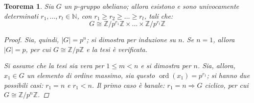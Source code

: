 \documentclass[12pt]{scrartcl}
\theoremstyle{style}
\newtheorem{teorema}{Teorema}[section]
\numberwithin{equation}{subsection}
\begin{document}
\begin{teorema}\label{corts2}
	Sia $G$ un $p$-gruppo abeliano; allora esistono e sono univocamente determinati $r_1,\ldots,r_t \in \mathbb{N}$, con $r_1\ge r_2\ge \ldots\ge r_t$, tali che:
	\[
	G \cong \mathbb{Z}/p^{r_1}\mathbb{Z} \times  \ldots \times \mathbb{Z} / p^{r_t}\mathbb{Z}
	\] 
	\begin{proof}
		Sia, quindi, $\lvert G \rvert =p^{n}$; si dimostra per induzione su $n$.
		Se $n=1$, allora $\lvert G \rvert = p$, per cui $G \cong \mathbb{Z} / p\mathbb{Z}$ e la tesi \`e verificata.

		Si assume che la tesi sia vera per $1 \le m < n $ e si dimostra per $n$. 
		Sia, allora, $x_1 \in G$ un elemento di ordine massimo, sia questo $\operatorname{ord}(x_1) =p^{r_1} $; si hanno due possibili casi: $r_1 = n$ e $r_1<n$.
		Il primo caso \`e banale: $r_1=n \Rightarrow G$ ciclico, per cui $G \cong \mathbb{Z}/p^n\mathbb{Z}$.


\end{proof}
\end{teorema}
\end{document}
